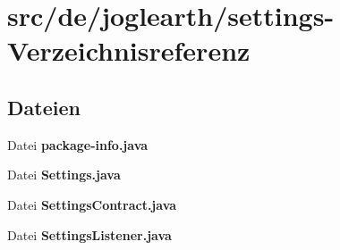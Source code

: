 \section{src/de/joglearth/settings-\/\-Verzeichnisreferenz}
\label{dir_ddfd0cfeb7c3831172b60a371ee983b7}
\subsection*{Dateien}
\begin{DoxyCompactItemize}
\item 
Datei {\bfseries package-\/info.\-java}
\item 
Datei {\bfseries Settings.\-java}
\item 
Datei {\bfseries Settings\-Contract.\-java}
\item 
Datei {\bfseries Settings\-Listener.\-java}
\end{DoxyCompactItemize}
